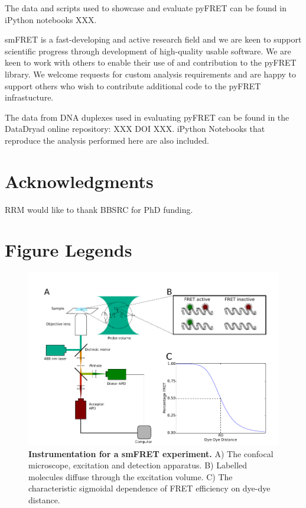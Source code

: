 \documentclass[10pt]{article}
\begin{document}
The data and scripts used to showcase and evaluate pyFRET can be found in iPython notebooks XXX.

smFRET is a fast-developing and active research field and we are keen to support scientific progress through development of high-quality usable software. We are keen to work with others to enable their use of and contribution to the pyFRET library. We welcome requests for custom analysis requirements and are happy to support others who wish to contribute additional code to the pyFRET infrastucture. 

The data from DNA duplexes used in evaluating pyFRET can be found in the DataDryad online repository: XXX DOI XXX. iPython Notebooks that reproduce the analysis performed here are also included.

\section*{Acknowledgments}
RRM would like to thank BBSRC for PhD funding.




\section*{Figure Legends}

\begin{figure}[!ht]
   \begin{center}
      \includegraphics*[clip=true, width=5in]{Fig1_schematic.pdf}
      \caption{{\bf Instrumentation for a smFRET experiment.} A) The confocal microscope, excitation and detection apparatus. B) Labelled molecules diffuse through the excitation volume. C) The characteristic sigmoidal dependence of FRET efficiency on dye-dye distance.}
      \label{fig:fig1_instrumentation}
   \end{center}
\end{figure}
\end{document}
